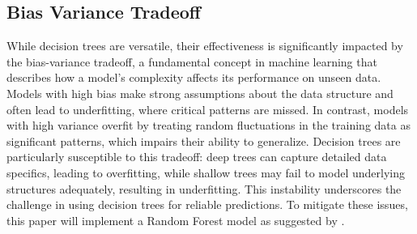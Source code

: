 \documentclass[12pt]{article}
\begin{document}
\subsection{Bias Variance Tradeoff}
While decision trees are versatile, their effectiveness is significantly impacted by the bias-variance tradeoff, a fundamental concept in machine learning that describes how a model's complexity affects its performance on unseen data. Models with high bias make strong assumptions about the data structure and often lead to underfitting, where critical patterns are missed. In contrast, models with high variance overfit by treating random fluctuations in the training data as significant patterns, which impairs their ability to generalize.
Decision trees are particularly susceptible to this tradeoff: deep trees can capture detailed data specifics, leading to overfitting, while shallow trees may fail to model underlying structures adequately, resulting in underfitting. This instability underscores the challenge in using decision trees for reliable predictions. To mitigate these issues, this paper will implement a Random Forest model as suggested by \citet{article}.
\end{document}
